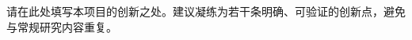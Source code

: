 \begin{GDNSFParagraphs}
请在此处填写本项目的创新之处。建议凝练为若干条明确、可验证的创新点，避免与常规研究内容重复。

\GDNSFBlankPara
\end{GDNSFParagraphs}
